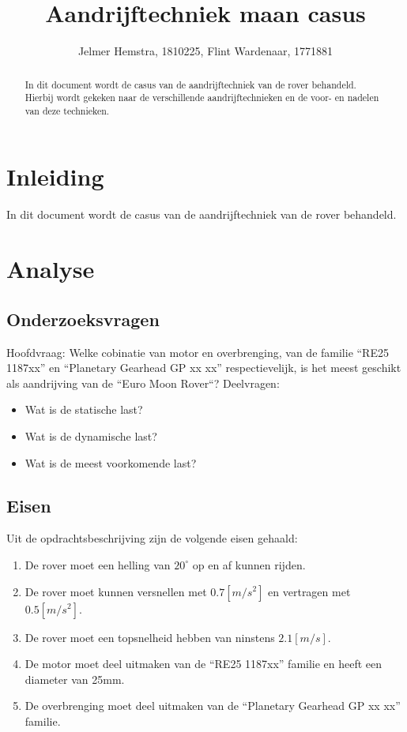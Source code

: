 \documentclass{article}
\title{Aandrijftechniek maan casus}
\author{Jelmer Hemstra, 1810225, Flint Wardenaar, 1771881}
\begin{document}
\maketitle

\begin{abstract}
    In dit document wordt de casus van de aandrijftechniek van de rover behandeld. Hierbij wordt gekeken naar de verschillende aandrijftechnieken en de voor- en nadelen van deze technieken.
\end{abstract}


\section{Inleiding}
    In dit document wordt de casus van de aandrijftechniek van de rover behandeld. 


\section{Analyse}
    \subsection{Onderzoeksvragen}
        Hoofdvraag: \newline
        Welke cobinatie van motor en overbrenging, 
        van de familie ``RE25 1187xx'' en ``Planetary Gearhead GP xx xx'' respectievelijk, 
        is het meest geschikt als aandrijving van de ``Euro Moon Rover``?
        \newline \newline
        Deelvragen: 
        \begin{itemize}
            \item Wat is de statische last?
            \item Wat is de dynamische last?
            \item Wat is de meest voorkomende last?
        \end{itemize}

    \subsection{Eisen}
        Uit de opdrachtsbeschrijving zijn de volgende eisen gehaald:
        \begin{enumerate}
            \item De rover moet een helling van $20^{\circ}$ op en af kunnen rijden.
            \item De rover moet kunnen versnellen met $0.7[m/s^2]$ en vertragen met $0.5[m/s^2]$.
            \item De rover moet een topsnelheid hebben van ninstens $2.1[m/s]$.
            \item De motor moet deel uitmaken van de ``RE25 1187xx'' familie en heeft een diameter van 25mm.
            \item De overbrenging moet deel uitmaken van de ``Planetary Gearhead GP xx xx'' familie.
        \end{enumerate}
    
\end{document}
